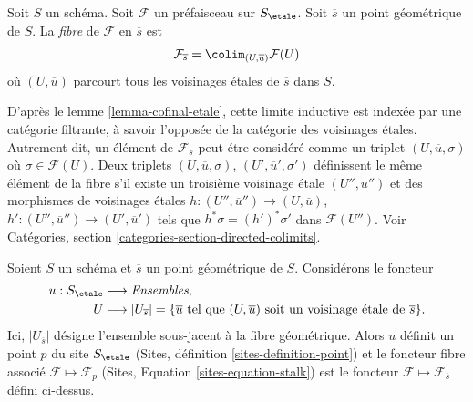 \begin{definition}
\label{definition-stalk}
Soit $S$ un sch\'ema.
Soit $\mathcal{F}$ un pr\'efaisceau sur $S_\etale$.
Soit $\overline{s}$ un point g\'eom\'etrique de $S$.
La {\it fibre} de $\mathcal{F}$ en $\overline{s}$ est
$$
\mathcal{F}_{\overline{s}}
=
\colim_{(U, \overline{u})} \mathcal{F}(U)
$$
o\`u $(U, \overline{u})$ parcourt tous les voisinages
\'etales de $\overline{s}$ dans $S$.
\end{definition}

\noindent
D'apr\`es le lemme \ref{lemma-cofinal-etale}, cette limite inductive est index\'ee par une cat\'egorie
filtrante, \`a savoir l'oppos\'ee de la cat\'egorie des voisinages \'etales.
Autrement dit, un \'el\'ement de $\mathcal{F}_{\overline{s}}$ peut \'etre
consid\'er\'e comme un triplet $(U, \overline{u}, \sigma)$ o\`u
$\sigma \in \mathcal{F}(U)$. Deux triplets
$(U, \overline{u}, \sigma)$, $(U', \overline{u}', \sigma')$
d\'efinissent le m\^eme \'el\'ement de la fibre s'il existe un troisi\`eme
voisinage \'etale $(U'', \overline{u}'')$ et des morphismes de voisinages
\'etales $h : (U'', \overline{u}'') \to (U, \overline{u})$,
$h' : (U'', \overline{u}'') \to (U', \overline{u}')$ tels que
$h^*\sigma = (h')^*\sigma'$ dans $\mathcal{F}(U'')$. Voir
Catégories, section \ref{categories-section-directed-colimits}.

\begin{lemma}
\label{lemma-stalk-gives-point}
Soient $S$ un sch\'ema et $\overline{s}$ un point g\'eom\'etrique de $S$.
Consid\'erons le foncteur
\begin{align*}
u : S_\etale & \longrightarrow \textit{Ensembles}, \\
U & \longmapsto
|U_{\overline{s}}|
=
\{\overline{u} \text{ tel que }(U, \overline{u})
\text{ soit un voisinage \'etale de }\overline{s}\}.
\end{align*}
Ici, $|U_{\overline{s}}|$ d\'esigne l'ensemble sous-jacent \`a la fibre g\'eom\'etrique.
Alors $u$ d\'efinit un point $p$ du site $S_\etale$
(Sites, définition \ref{sites-definition-point})
et le foncteur fibre associ\'e $\mathcal{F} \mapsto \mathcal{F}_p$
(Sites, Equation \ref{sites-equation-stalk})
est le foncteur $\mathcal{F} \mapsto \mathcal{F}_{\overline{s}}$
d\'efini ci-dessus.
\end{lemma}

